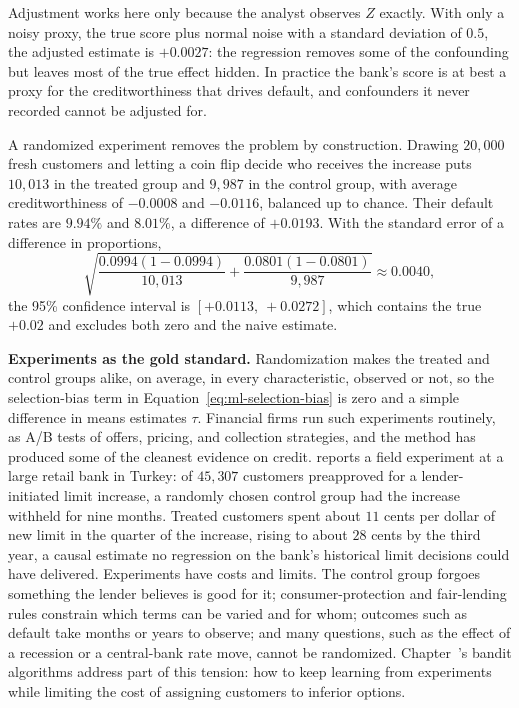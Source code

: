 \documentclass[../ai_in_finance]{subfiles}
\begin{document}
Adjustment works here only because the analyst observes $Z$ exactly. With only a noisy proxy, the true score plus normal noise with a standard deviation of $0.5$, the adjusted estimate is $+0.0027$: the regression removes some of the confounding but leaves most of the true effect hidden. In practice the bank's score is at best a proxy for the creditworthiness that drives default, and confounders it never recorded cannot be adjusted for.

A randomized experiment removes the problem by construction. Drawing $20{,}000$ fresh customers and letting a coin flip decide who receives the increase puts $10{,}013$ in the treated group and $9{,}987$ in the control group, with average creditworthiness of $-0.0008$ and $-0.0116$, balanced up to chance. Their default rates are $9.94\%$ and $8.01\%$, a difference of $+0.0193$. With the standard error of a difference in proportions,
\begin{equation*}
\sqrt{\frac{0.0994(1-0.0994)}{10{,}013} + \frac{0.0801(1-0.0801)}{9{,}987}} \approx 0.0040,
\end{equation*}
the 95\% confidence interval is $[+0.0113,\ +0.0272]$, which contains the true $+0.02$ and excludes both zero and the naive estimate.

\textbf{Experiments as the gold standard.} Randomization makes the treated and control groups alike, on average, in every characteristic, observed or not, so the selection-bias term in Equation~\eqref{eq:ml-selection-bias} is zero and a simple difference in means estimates $\tau$. Financial firms run such experiments routinely, as A/B tests of offers, pricing, and collection strategies, and the method has produced some of the cleanest evidence on credit. \textcite{aydin2022consumption} reports a field experiment at a large retail bank in Turkey: of $45{,}307$ customers preapproved for a lender-initiated limit increase, a randomly chosen control group had the increase withheld for nine months. Treated customers spent about $11$ cents per dollar of new limit in the quarter of the increase, rising to about $28$ cents by the third year, a causal estimate no regression on the bank's historical limit decisions could have delivered. Experiments have costs and limits. The control group forgoes something the lender believes is good for it; consumer-protection and fair-lending rules constrain which terms can be varied and for whom; outcomes such as default take months or years to observe; and many questions, such as the effect of a recession or a central-bank rate move, cannot be randomized. Chapter~'s bandit algorithms address part of this tension: how to keep learning from experiments while limiting the cost of assigning customers to inferior options.
\end{document}

